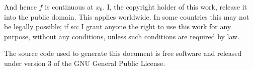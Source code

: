 \documentclass{article}
\theoremstyle{normal}
\begin{document}
    And hence $f$ is continuous at $x_{0}$.
    \newpage
    I, the copyright holder of this work, release it into the public domain.
    This applies worldwide. In some countries this may not be legally possible;
    if so: I grant anyone the right to use this work for any purpose, without
    any conditions, unless such conditions are required by law.
    \par\hfill\par
    The source code used to generate this document is free software and released
    under version 3 of the GNU General Public License.
\end{document}
